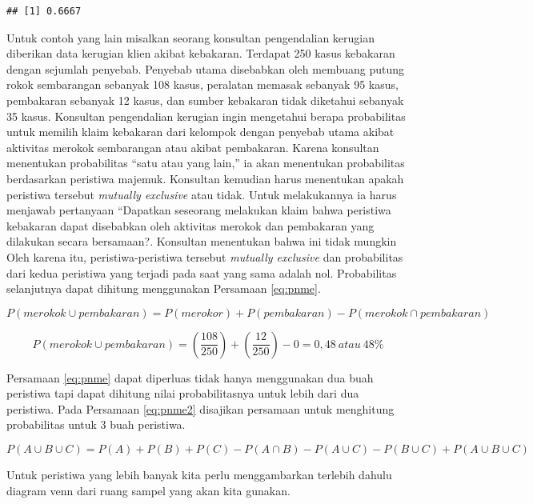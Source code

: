 \documentclass[]{book}
\begin{document}
\begin{verbatim}
## [1] 0.6667
\end{verbatim}

Untuk contoh yang lain misalkan seorang konsultan pengendalian kerugian
diberikan data kerugian klien akibat kebakaran. Terdapat 250 kasus
kebakaran dengan sejumlah penyebab. Penyebab utama disebabkan oleh
membuang putung rokok sembarangan sebanyak 108 kasus, peralatan memasak
sebanyak 95 kasus, pembakaran sebanyak 12 kasus, dan sumber kebakaran
tidak diketahui sebanyak 35 kasus. Konsultan pengendalian kerugian ingin
mengetahui berapa probabilitas untuk memilih klaim kebakaran dari
kelompok dengan penyebab utama akibat aktivitas merokok sembarangan atau
akibat pembakaran. Karena konsultan menentukan probabilitas ``satu atau
yang lain,'' ia akan menentukan probabilitas berdasarkan peristiwa
majemuk. Konsultan kemudian harus menentukan apakah peristiwa tersebut
\emph{mutually exclusive} atau tidak. Untuk melakukannya ia harus
menjawab pertanyaan ``Dapatkan seseorang melakukan klaim bahwa peristiwa
kebakaran dapat disebabkan oleh aktivitas merokok dan pembakaran yang
dilakukan secara bersamaan?. Konsultan menentukan bahwa ini tidak
mungkin Oleh karena itu, peristiwa-peristiwa tersebut \emph{mutually
exclusive} dan probabilitas dari kedua peristiwa yang terjadi pada saat
yang sama adalah nol. Probabilitas selanjutnya dapat dihitung
menggunakan Persamaan \eqref{eq:pnme}.

\[
P\left(merokok\cup pembakaran\right)=P\left(merokor\right)+P\left(pembakaran\right)-P\left(merokok\cap pembakaran\right)
\]

\[
P\left(merokok\cup pembakaran\right)=\left(\frac{108}{250}\right)+\left(\frac{12}{250}\right)-0=0,48\ atau\ 48\%
\]

Persamaan \eqref{eq:pnme} dapat diperluas tidak hanya menggunakan dua buah
peristiwa tapi dapat dihitung nilai probabilitasnya untuk lebih dari dua
peristiwa. Pada Persamaan \eqref{eq:pnme2} disajikan persamaan untuk
menghitung probabilitas untuk 3 buah peristiwa.

\begin{equation}
   P\left(A\cup B\cup C\right)=P\left(A\right)+P\left(B\right)+P\left(C\right)-P\left(A\cap B\right)-P\left(A\cup C\right)-P\left(B\cup C\right)+P\left(A\cup B\cup C\right)
  \label{eq:pnme2}
\end{equation}

Untuk peristiwa yang lebih banyak kita perlu menggambarkan terlebih
dahulu diagram venn dari ruang sampel yang akan kita gunakan.
\end{document}
